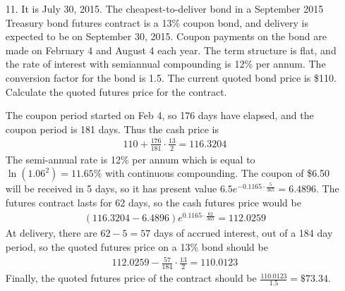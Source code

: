 \documentclass{article}
\begin{document}
\begin{itemize}
	\item[11.] It is July 30, 2015. The cheapest-to-deliver bond in a September 2015 Treasury bond futures contract is a 13\% coupon bond, and delivery is expected to be on September 30, 2015. Coupon payments on the bond are made on February 4 and August 4 each year. The term structure is flat, and the rate of interest with semiannual compounding is 12\% per annum. The conversion factor for the bond is 1.5. The current quoted bond price is \$110. Calculate the quoted futures price for the contract.
		\begin{soln}
			The coupon period started on Feb 4, so 176 days have elapsed, and the coupon period is 181 days. Thus the cash price is
			\begin{align*}
				110 + \frac{176}{181}\cdot \frac{13}{2} = 116.3204
			\end{align*}
			The semi-annual rate is 12\% per annum which is equal to $\ln(1.06^2)=11.65\%$ with continuous compounding. The coupon of \$6.50 will be received in 5 days, so it has present value $6.5e^{-0.1165\cdot \frac{5}{365}} = 6.4896.$ The futures contract lasts for 62 days, so the cash futures price would be
			\begin{align*}
				(116.3204-6.4896)e^{0.1165\cdot \frac{62}{365}} = 112.0259
			\end{align*}
			At delivery, there are $62-5=57$ days of accrued interest, out of a 184 day period, so the quoted futures price on a 13\% bond should be
			\begin{align*}
				112.0259-\frac{57}{184}\cdot \frac{13}{2} = 110.0123
			\end{align*}
			Finally, the quoted futures price of the contract should be $\frac{110.0123}{1.5} = \$73.34.$
		\end{soln}


\end{itemize}
\end{document}
